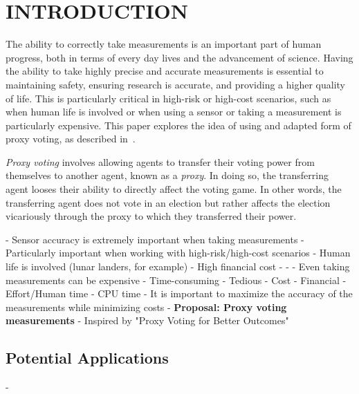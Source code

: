%
%

\chapter{INTRODUCTION}\label{ch:introduction}
\thispagestyle{empty}

The ability to correctly take measurements is an important part of human
progress, both in terms of every day lives and the advancement of science.
Having the ability to take highly precise and accurate measurements is essential
to maintaining safety, ensuring research is accurate, and providing a higher
quality of life.
This is particularly critical in high-risk or high-cost scenarios, such as when
human life is involved or when using a sensor or taking a measurement is
particularly expensive.  %
This paper explores the idea of using and adapted form of proxy voting, as
described in~\cite{Cohensius2017}.

\textit{Proxy voting} involves allowing agents to transfer their voting power
from themselves to another agent, known as a \textit{proxy}\cite[para. 1.4]
{Cohensius2017}.
In doing so, the transferring agent looses their ability to directly affect the
voting game.
In other words, the transferring agent does not vote in an election but rather
affects the election vicariously through the proxy to which they transferred
their power.





- Sensor accuracy is extremely important when taking measurements
- Particularly important when working with high-risk/high-cost scenarios
    - Human life is involved (lunar landers, for example)
    - High financial cost
    - %
    - %
- Even taking measurements can be expensive
    - Time-consuming
    - Tedious
    - Cost
        - Financial
        - Effort/Human time
        - CPU time
- It is important to maximize the accuracy of the measurements while minimizing
  costs
    - \textbf{Proposal: Proxy voting measurements}
        - Inspired by "Proxy Voting for Better Outcomes"\cite{Cohensius2017}

\section{Potential Applications}\label{sec:potential-applications}
- %

